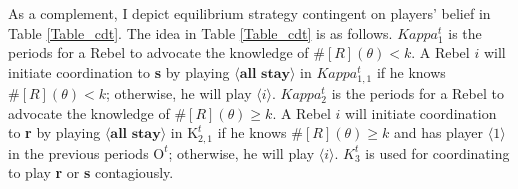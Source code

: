 \documentclass[12pt,letter]{article}
\newcommand{\Kappa}{\mathrm{K}}
\newcommand{\Omicron}{\mathrm{O}}
\theoremstyle{definition}
\theoremstyle{remark}
\theoremstyle{claim}
\begin{document}
As a complement, I depict equilibrium strategy contingent on players' belief in Table \ref{Table_cdt}. The idea in Table \ref{Table_cdt} is as follows. $Kappa^t_1$ is the periods for a Rebel to advocate the knowledge of $\# [R](\theta)<k$. A Rebel $i$ will initiate coordination to \textbf{s} by playing $\langle \textbf{all stay} \rangle$ in $Kappa^t_{1,1}$ if he knows $\# [R](\theta)<k$; otherwise, he will play $\langle i \rangle$. $Kappa^t_2$ is the periods for a Rebel to advocate the knowledge of $\# [R](\theta)\geq k$. A Rebel $i$ will initiate coordination to \textbf{r} by playing $\langle \textbf{all stay} \rangle$ in $\Kappa^t_{2,1}$ if he knows $\# [R](\theta)\geq k$ and has player $\langle 1 \rangle$ in the previous periods $\Omicron^t$; otherwise, he will play $\langle i \rangle$. $K^t_3$ is used for coordinating to play \textbf{r} or \textbf{s} contagiously.
\end{document}

